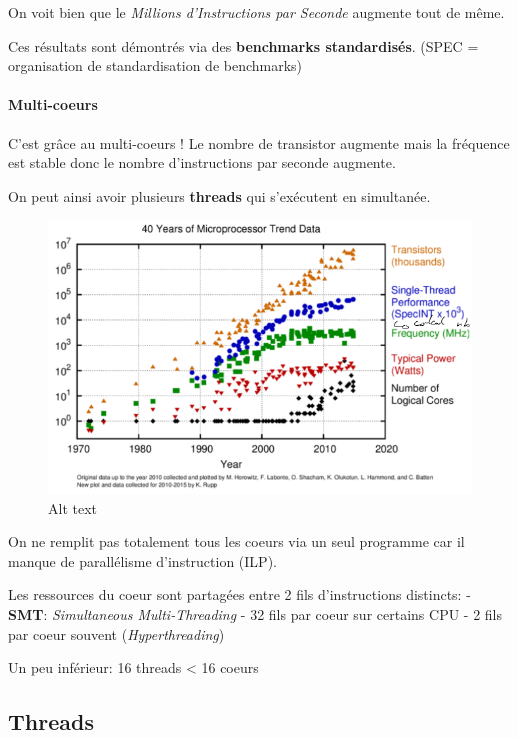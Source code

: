 On voit bien que le \emph{Millions d'Instructions par Seconde} augmente
tout de même.

Ces résultats sont démontrés via des \textbf{benchmarks standardisés}.
(SPEC = organisation de standardisation de benchmarks)

\paragraph{Multi-coeurs}\label{multi-coeurs}

C'est grâce au multi-coeurs ! Le nombre de transistor augmente mais la
fréquence est stable donc le nombre d'instructions par seconde augmente.

On peut ainsi avoir plusieurs \textbf{threads} qui s'exécutent en
simultanée.

\begin{figure}
\centering
\includegraphics{image-23.png}
\caption{Alt text}
\end{figure}

On ne remplit pas totalement tous les coeurs via un seul programme car
il manque de parallélisme d'instruction (ILP).

Les ressources du coeur sont partagées entre 2 fils d'instructions
distincts: - \textbf{SMT}: \emph{Simultaneous Multi-Threading} - 32 fils
par coeur sur certains CPU - 2 fils par coeur souvent
(\emph{Hyperthreading})

Un peu inférieur: 16 threads \textless{} 16 coeurs

\subsection{Threads}\label{threads}

